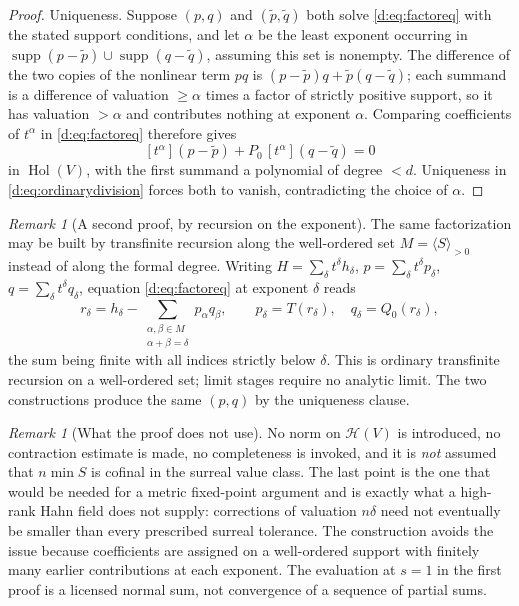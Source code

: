 \documentclass[11pt,a4paper]{article}
\numberwithin{equation}{section}
\theoremstyle{definition}
\theoremstyle{remark}
\newtheorem{remark}[theorem]{Remark}
\theoremstyle{plain}
\DeclareMathOperator{\Hol}{Hol}
\DeclareMathOperator{\supp}{supp}
\newcommand{\tm}{t}
\newcommand{\Hc}{\mathcal H}
\newcommand{\Neu}[1]{\langle #1\rangle}
\begin{document}
\begin{proof}
Uniqueness.  Suppose $(p,q)$ and $(\widetilde p,\widetilde q)$ both
solve \eqref{d:eq:factoreq} with the stated support conditions, and let
$\alpha$ be the least exponent occurring in
$\supp(p-\widetilde p)\cup\supp(q-\widetilde q)$, assuming this set is
nonempty.  The difference of the two copies of the nonlinear term $pq$
is $(p-\widetilde p)q+\widetilde p(q-\widetilde q)$; each summand is a
difference of valuation $\ge\alpha$ times a factor of strictly positive
support, so it has valuation $>\alpha$ and contributes nothing at
exponent $\alpha$.  Comparing coefficients of $\tm^{\alpha}$ in
\eqref{d:eq:factoreq} therefore gives
\[
 [\tm^{\alpha}](p-\widetilde p)+P_0\,[\tm^{\alpha}](q-\widetilde q)=0
\]
in $\Hol(V)$, with the first summand a polynomial of degree $<d$.
Uniqueness in \eqref{d:eq:ordinarydivision} forces both to vanish,
contradicting the choice of $\alpha$.
\end{proof}

\begin{remark}[A second proof, by recursion on the exponent]
\label{d:rem:exponentrecursion}
The same factorization may be built by transfinite recursion along the
well-ordered set $M=\Neu{S}_{>0}$ instead of along the formal degree.
Writing $H=\sum_{\delta}\tm^{\delta}h_\delta$,
$p=\sum_{\delta}\tm^{\delta}p_\delta$,
$q=\sum_{\delta}\tm^{\delta}q_\delta$, equation
\eqref{d:eq:factoreq} at exponent $\delta$ reads
\[
 r_\delta=h_\delta-\!\!\sum_{\substack{\alpha,\beta\in M\\ \alpha+\beta=\delta}}\!\!p_\alpha q_\beta,
 \qquad p_\delta=T(r_\delta),\quad q_\delta=Q_0(r_\delta),
\]
the sum being finite with all indices strictly below $\delta$.  This is
ordinary transfinite recursion on a well-ordered set; limit stages
require no analytic limit.  The two constructions produce the same
$(p,q)$ by the uniqueness clause.
\end{remark}

\begin{remark}[What the proof does not use]
\label{d:rem:nonorm}
No norm on $\Hc(V)$ is introduced, no contraction estimate is made, no
completeness is invoked, and it is \emph{not} assumed that
$n\min S$ is cofinal in the surreal value class.  The last point is the
one that would be needed for a metric fixed-point argument and is
exactly what a high-rank Hahn field does not supply: corrections of
valuation $n\delta$ need not eventually be smaller than every
prescribed surreal tolerance.  The construction avoids the issue
because coefficients are assigned on a well-ordered support with
finitely many earlier contributions at each exponent.  The evaluation at
$s=1$ in the first proof is a licensed normal sum, not convergence of a
sequence of partial sums.
\end{remark}
\end{document}
